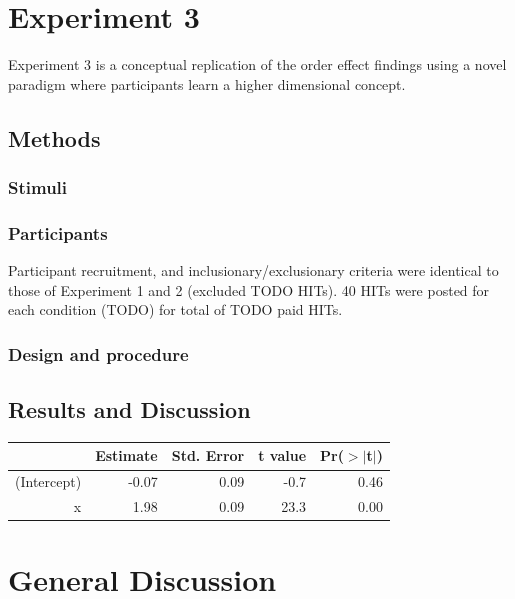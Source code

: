\documentclass[10pt, letterpaper]{article}
\begin{document}
\section{Experiment 3}\label{experiment-3}

Experiment 3 is a conceptual replication of the order effect findings
using a novel paradigm where participants learn a higher dimensional
concept.

\subsection{Methods}\label{methods-3}

\subsubsection{Stimuli}\label{stimuli-3}

\subsubsection{Participants}\label{participants-3}

Participant recruitment, and inclusionary/exclusionary criteria were
identical to those of Experiment 1 and 2 (excluded TODO HITs). 40 HITs
were posted for each condition (TODO) for total of TODO paid HITs.

\subsubsection{Design and procedure}\label{design-and-procedure-3}

\subsection{Results and Discussion}\label{results-and-discussion-3}

\begin{table}[H]
\centering
\begin{tabular}{rrrrr}
  \hline
 & Estimate & Std. Error & t value & Pr($>$$|$t$|$) \\ 
  \hline
(Intercept) & -0.07 & 0.09 & -0.7 & 0.46 \\ 
  x & 1.98 & 0.09 & 23.3 & 0.00 \\ 
   \hline
\end{tabular}
\end{table}

\section{General Discussion}\label{general-discussion}
\end{document}
